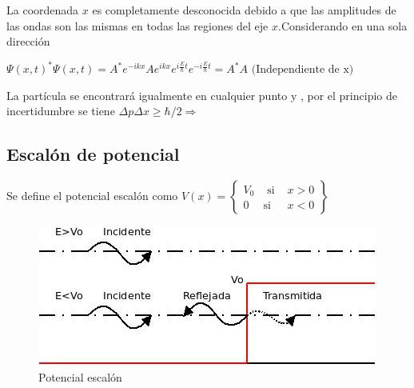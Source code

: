 \documentclass[oneside]{book}
\numberwithin{equation}{section}
\numberwithin{figure}{section}
\numberwithin{table}{section}
\begin{document}
					La coordenada $x$ es completamente desconocida debido a que las amplitudes de las ondas son las mismas en todas las regiones del eje $x$.Considerando en una sola dirección\\
					
					\begin{center}
					$\Psi(x,t)^*\Psi(x,t)=A^*e^{-ikx}Ae^{ikx}e^{i\frac{E}{\hbar}t}e^{-i\frac{E}{\hbar}t}=A^*A \text{ (Independiente de x)}$\\
					\end{center}
				
					La partícula se encontrará igualmente en cualquier punto y , por el principio de incertidumbre se tiene $\Delta p \Delta x \geq \hbar/2 \Rightarrow$ \\					
				
				\subsection{Escalón de potencial}		
				
				Se define el potencial escalón como $\displaystyle V(x)=\begin{Bmatrix} V_0 & \mbox{ si }& x>0 \\ 0 & \mbox{si}& x<0\end{Bmatrix}$
				
				\begin{figure}[H]
					\includegraphics[scale=1]{Escalon.jpeg}
					\caption{Potencial escalón}
				\end{figure}
				
\end{document}
